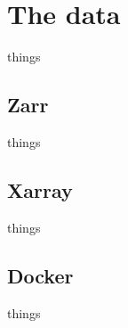 \chapter{The data}
    things
    
    \section{Zarr}
        things
    \section{Xarray}
        things
        
    \section{Docker}
        things
        
        